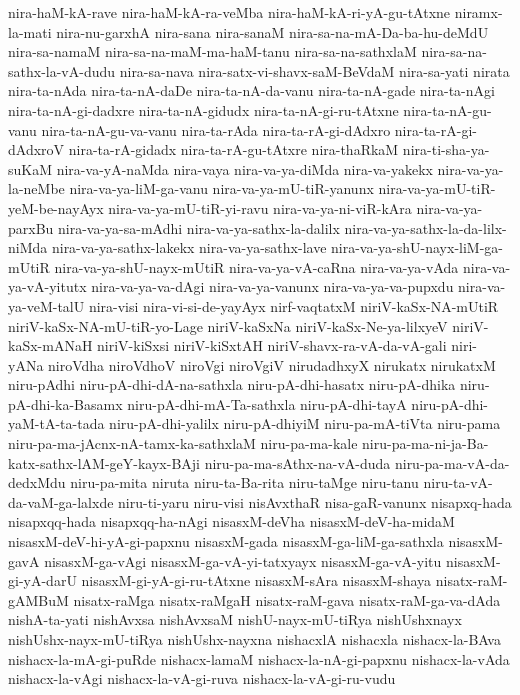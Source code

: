 {nira-haM-kA-rave
nira-haM-kA-ra-veMba
nira-haM-kA-ri-yA-gu-tAtxne
niramx-la-mati
nira-nu-garxhA
nira-sana
nira-sanaM
nira-sa-na-mA-Da-ba-hu-deMdU
nira-sa-namaM
nira-sa-na-maM-ma-haM-tanu
nira-sa-na-sathxlaM
nira-sa-na-sathx-la-vA-dudu
nira-sa-nava
nira-satx-vi-shavx-saM-BeVdaM
nira-sa-yati
nirata
nira-ta-nAda
nira-ta-nA-daDe
nira-ta-nA-da-vanu
nira-ta-nA-gade
nira-ta-nAgi
nira-ta-nA-gi-dadxre
nira-ta-nA-gidudx
nira-ta-nA-gi-ru-tAtxne
nira-ta-nA-gu-vanu
nira-ta-nA-gu-va-vanu
nira-ta-rAda
nira-ta-rA-gi-dAdxro
nira-ta-rA-gi-dAdxroV
nira-ta-rA-gidadx
nira-ta-rA-gu-tAtxre
nira-thaRkaM
nira-ti-sha-ya-suKaM
nira-va-yA-naMda
nira-vaya
nira-va-ya-diMda
nira-va-yakekx
nira-va-ya-la-neMbe
nira-va-ya-liM-ga-vanu
nira-va-ya-mU-tiR-yanunx
nira-va-ya-mU-tiR-yeM-be-nayAyx
nira-va-ya-mU-tiR-yi-ravu
nira-va-ya-ni-viR-kAra
nira-va-ya-parxBu
nira-va-ya-sa-mAdhi
nira-va-ya-sathx-la-dalilx
nira-va-ya-sathx-la-da-lilx-niMda
nira-va-ya-sathx-lakekx
nira-va-ya-sathx-lave
nira-va-ya-shU-nayx-liM-ga-mUtiR
nira-va-ya-shU-nayx-mUtiR
nira-va-ya-vA-caRna
nira-va-ya-vAda
nira-va-ya-vA-yitutx
nira-va-ya-va-dAgi
nira-va-ya-vanunx
nira-va-ya-va-pupxdu
nira-va-ya-veM-talU
nira-visi
nira-vi-si-de-yayAyx
nirf-vaqtatxM
niriV-kaSx-NA-mUtiR
niriV-kaSx-NA-mU-tiR-yo-Lage
niriV-kaSxNa
niriV-kaSx-Ne-ya-lilxyeV
niriV-kaSx-mANaH
niriV-kiSxsi
niriV-kiSxtAH
niriV-shavx-ra-vA-da-vA-gali
niri-yANa
niroVdha
niroVdhoV
niroVgi
niroVgiV
nirudadhxyX
nirukatx
nirukatxM
niru-pAdhi
niru-pA-dhi-dA-na-sathxla
niru-pA-dhi-hasatx
niru-pA-dhika
niru-pA-dhi-ka-Basamx
niru-pA-dhi-mA-Ta-sathxla
niru-pA-dhi-tayA
niru-pA-dhi-yaM-tA-ta-tada
niru-pA-dhi-yalilx
niru-pA-dhiyiM
niru-pa-mA-tiVta
niru-pama
niru-pa-ma-jAcnx-nA-tamx-ka-sathxlaM
niru-pa-ma-kale
niru-pa-ma-ni-ja-Ba-katx-sathx-lAM-geY-kayx-BAji
niru-pa-ma-sAthx-na-vA-duda
niru-pa-ma-vA-da-dedxMdu
niru-pa-mita
niruta
niru-ta-Ba-rita
niru-taMge
niru-tanu
niru-ta-vA-da-vaM-ga-lalxde
niru-ti-yaru
niru-visi
nisAvxthaR
nisa-gaR-vanunx
nisapxq-hada
nisapxqq-hada
nisapxqq-ha-nAgi
nisasxM-deVha
nisasxM-deV-ha-midaM
nisasxM-deV-hi-yA-gi-papxnu
nisasxM-gada
nisasxM-ga-liM-ga-sathxla
nisasxM-gavA
nisasxM-ga-vAgi
nisasxM-ga-vA-yi-tatxyayx
nisasxM-ga-vA-yitu
nisasxM-gi-yA-darU
nisasxM-gi-yA-gi-ru-tAtxne
nisasxM-sAra
nisasxM-shaya
nisatx-raM-gAMBuM
nisatx-raMga
nisatx-raMgaH
nisatx-raM-gava
nisatx-raM-ga-va-dAda
nishA-ta-yati
nishAvxsa
nishAvxsaM
nishU-nayx-mU-tiRya
nishUshxnayx
nishUshx-nayx-mU-tiRya
nishUshx-nayxna
nishacxlA
nishacxla
nishacx-la-BAva
nishacx-la-mA-gi-puRde
nishacx-lamaM
nishacx-la-nA-gi-papxnu
nishacx-la-vAda
nishacx-la-vAgi
nishacx-la-vA-gi-ruva
nishacx-la-vA-gi-ru-vudu
}
